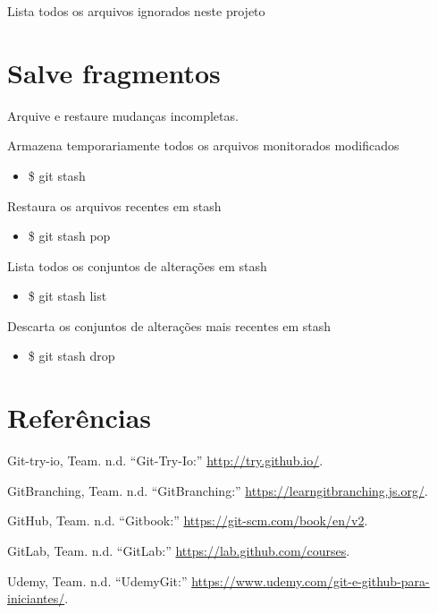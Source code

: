 \documentclass[]{tufte-handout}
\providecommand{\tightlist}{%
  \setlength{\itemsep}{0pt}\setlength{\parskip}{0pt}}
\begin{document}
Lista todos os arquivos ignorados neste projeto

\section{Salve fragmentos}\label{salve-fragmentos}

Arquive e restaure mudanças incompletas.

Armazena temporariamente todos os arquivos monitorados modificados

\begin{itemize}
\tightlist
\item
  \$ git stash
\end{itemize}

Restaura os arquivos recentes em stash

\begin{itemize}
\tightlist
\item
  \$ git stash pop
\end{itemize}

Lista todos os conjuntos de alterações em stash

\begin{itemize}
\tightlist
\item
  \$ git stash list
\end{itemize}

Descarta os conjuntos de alterações mais recentes em stash

\begin{itemize}
\tightlist
\item
  \$ git stash drop
\end{itemize}

\section*{Referências}\label{referencias}

\hypertarget{refs}{}
\hypertarget{ref-Gittryio}{}
Git-try-io, Team. n.d. ``Git-Try-Io:'' \url{http://try.github.io/}.

\hypertarget{ref-GitBranching}{}
GitBranching, Team. n.d. ``GitBranching:''
\url{https://learngitbranching.js.org/}.

\hypertarget{ref-Gitbook}{}
GitHub, Team. n.d. ``Gitbook:'' \url{https://git-scm.com/book/en/v2}.

\hypertarget{ref-GitLab}{}
GitLab, Team. n.d. ``GitLab:'' \url{https://lab.github.com/courses}.

\hypertarget{ref-UdemyGit}{}
Udemy, Team. n.d. ``UdemyGit:''
\url{https://www.udemy.com/git-e-github-para-iniciantes/}.
\end{document}
